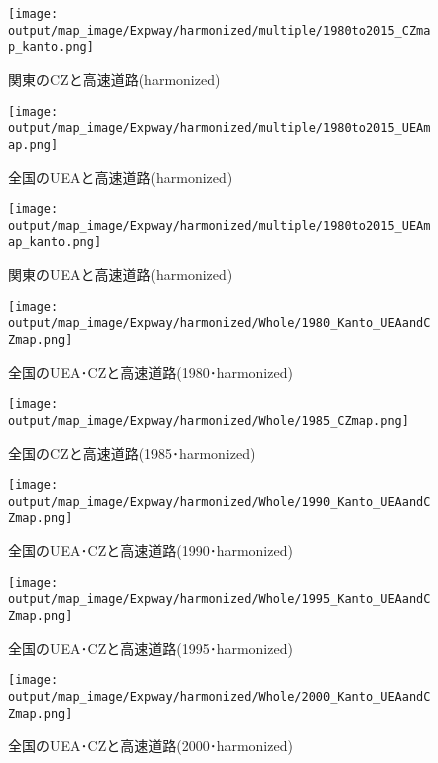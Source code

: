 \documentclass{ltjsarticle}
\begin{document}
\begin{figure}[pbth]
  \centering
  \texttt{[image: output/map\_image/Expway/harmonized/multiple/1980to2015\_CZmap\_kanto.png]}
  \caption{\label{ham:KanCZandExpway}関東のCZと高速道路(harmonized)}
\end{figure}


\begin{figure}[pbth]
  \centering
  \texttt{[image: output/map\_image/Expway/harmonized/multiple/1980to2015\_UEAmap.png]}
  \caption{\label{ham:allUEAandExpway}全国のUEAと高速道路(harmonized)}
\end{figure}


\begin{figure}[pbth]
  \centering
  \texttt{[image: output/map\_image/Expway/harmonized/multiple/1980to2015\_UEAmap\_kanto.png]}
  \caption{\label{ham:KanUEAandExpway}関東のUEAと高速道路(harmonized)}
\end{figure}

\begin{figure}[pbth]
  \centering
  \texttt{[image: output/map\_image/Expway/harmonized/Whole/1980\_Kanto\_UEAandCZmap.png]}
  \caption{\label{ham:1980:allCZandUEA:Expway}全国のUEA･CZと高速道路(1980･harmonized)}
\end{figure}


\begin{figure}[pbth]
  \centering
  \texttt{[image: output/map\_image/Expway/harmonized/Whole/1985\_CZmap.png]}
  \caption{\label{ham:1985:allCZandUEA:Expway}全国のCZと高速道路(1985･harmonized)}
\end{figure}


\begin{figure}[pbth]
  \centering
  \texttt{[image: output/map\_image/Expway/harmonized/Whole/1990\_Kanto\_UEAandCZmap.png]}
  \caption{\label{ham:1990:allCZandUEA:Expway}全国のUEA･CZと高速道路(1990･harmonized)}
\end{figure}


\begin{figure}[pbth]
  \centering
  \texttt{[image: output/map\_image/Expway/harmonized/Whole/1995\_Kanto\_UEAandCZmap.png]}
  \caption{\label{ham:1995:allCZandUEA:Expway}全国のUEA･CZと高速道路(1995･harmonized)}
\end{figure}


\begin{figure}[pbth]
  \centering
  \texttt{[image: output/map\_image/Expway/harmonized/Whole/2000\_Kanto\_UEAandCZmap.png]}
  \caption{\label{ham:2000:allCZandUEA:Expway}全国のUEA･CZと高速道路(2000･harmonized)}
\end{figure}
\end{document}
